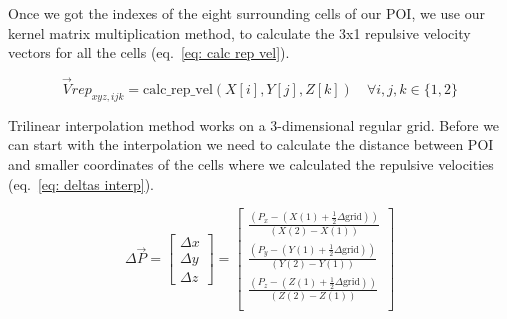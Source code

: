 \documentclass[letterpaper, 10 pt, conference]{ieeeconf}  %
\begin{document}
Once we got the indexes of the eight surrounding cells of our POI, we use our kernel matrix multiplication method, to calculate the 3x1 repulsive velocity vectors for all the cells (eq.~\ref{eq: calc rep vel}).

\begin{equation}
	\label{eq: calc rep vel}
	\vec{V}rep_{xyz,ijk} = \mathrm{calc\_rep\_vel}(X[i], Y[j], Z[k]) \quad \forall i, j, k \in \{1, 2\}
\end{equation}

Trilinear interpolation method works on a 3-dimensional regular grid. Before we can start with the interpolation we need to calculate the distance between POI and smaller coordinates of the cells where we calculated the repulsive velocities (eq.~\ref{eq: deltas interp}). 

%
%

\begin{equation}
	\label{eq: deltas interp}
	\Delta \vec{P} =
	\begin{bmatrix}
		\Delta x \\
		\Delta y \\
		\Delta z		
	\end{bmatrix}
	=
	\begin{bmatrix}
		\frac{\left( P_x - \left( X(1) + \frac{1}{2} \Delta \mathrm{grid} \right)  \right)}{\left( X(2) - X(1) \right)} \\
		\frac{\left( P_y - \left( Y(1) + \frac{1}{2} \Delta \mathrm{grid} \right)  \right)}{\left( Y(2) - Y(1) \right)} \\
		\frac{\left( P_z - \left( Z(1) + \frac{1}{2} \Delta \mathrm{grid} \right)  \right)}{\left( Z(2) - Z(1) \right)} \\
	\end{bmatrix}
\end{equation}
\end{document}
